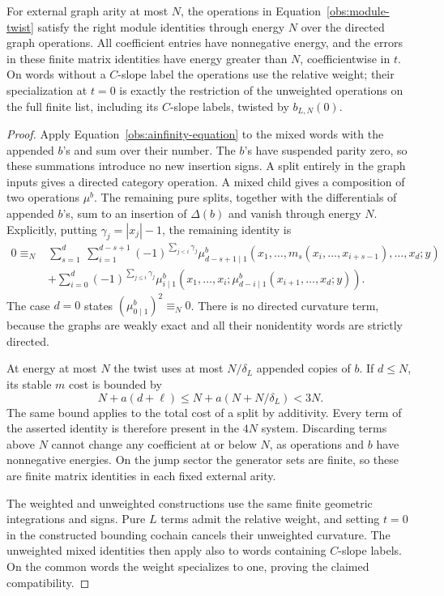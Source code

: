 \begin{corollary}
\label{obs:finite-module}
For external graph arity at most $N$, the operations in
Equation~\eqref{obs:module-twist} satisfy the right module
identities through energy $N$ over the directed graph
operations.  All coefficient entries have nonnegative
energy, and the errors in these finite matrix identities
have energy greater than $N$, coefficientwise in $t$.
On words without a $C$-slope label the operations use the
relative weight; their specialization at $t=0$ is exactly
the restriction of the unweighted operations on the full
finite list, including its $C$-slope labels, twisted by
$b_{L,N}(0)$.
\end{corollary}

\begin{proof}
Apply Equation~\eqref{obs:ainfinity-equation} to the mixed
words with the appended $b$'s and sum over their number.
The $b$'s have suspended parity zero, so these summations
introduce no new insertion signs.  A split entirely in the
graph inputs gives a directed category operation.  A mixed
child gives a composition of two operations $\mu^b$.
The remaining pure splits, together with the differentials
of appended $b$'s, sum to an insertion of $\Delta(b)$ and
vanish through energy $N$.  Explicitly, putting
$\gamma_j=|x_j|-1$, the remaining identity is
\begin{align*}
0\equiv_N{}&
 \sum_{s=1}^{d}\ \sum_{i=1}^{d-s+1}
 (-1)^{\sum_{j<i}\gamma_j}
 \mu^b_{d-s+1\mid1}
    (x_1,\ldots,m_s(x_i,\ldots,x_{i+s-1}),\ldots,x_d;y)\\
 &+\sum_{i=0}^{d}(-1)^{\sum_{j\le i}\gamma_j}
 \mu^b_{i\mid1}
    (x_1,\ldots,x_i;
       \mu^b_{d-i\mid1}(x_{i+1},\ldots,x_d;y)).
\end{align*}
The case $d=0$ states $(\mu^b_{0\mid1})^2\equiv_N0$.
There is no directed curvature term, because the graphs
are weakly exact and all their nonidentity words are
strictly directed.

At energy at most $N$ the twist uses at most
$N/\delta_L$ appended copies of $b$.  If $d\le N$, its
stable $m$ cost is bounded by
\[
 N+a(d+\ell)\le N+a(N+N/\delta_L)<3N.
\]
The same bound applies to the total cost of a split by
additivity.  Every term of the asserted identity is
therefore present in the $4N$ system.  Discarding terms
above $N$ cannot change any coefficient at or below $N$,
as operations and $b$ have nonnegative energies.  On the
jump sector the generator sets are finite, so these are
finite matrix identities in each fixed external arity.

The weighted and unweighted constructions use the same
finite geometric integrations and signs.  Pure $L$ terms
admit the relative weight, and setting $t=0$ in the
constructed bounding cochain cancels their unweighted
curvature.  The unweighted mixed identities then apply
also to words containing $C$-slope labels.  On the common
words the weight specializes to one, proving the claimed
compatibility.
\end{proof}
